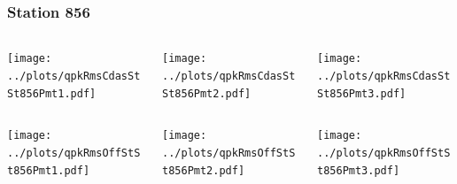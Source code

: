 \documentclass[aspectratio=169]{beamer}
\begin{document}
\begin{frame} 
  \frametitle{Station 856}
  \begin{center}
    \begin{columns}
      \begin{column}{0.33\textwidth}
        \texttt{[image: ../plots/qpkRmsCdasStSt856Pmt1.pdf]}
      \end{column}
      \begin{column}{0.33\textwidth}
        \texttt{[image: ../plots/qpkRmsCdasStSt856Pmt2.pdf]}
      \end{column}
      \begin{column}{0.33\textwidth}
        \texttt{[image: ../plots/qpkRmsCdasStSt856Pmt3.pdf]}
      \end{column}
    \end{columns}
  \end{center}

  \begin{center}
    \begin{columns}
      \begin{column}{0.33\textwidth}
        \texttt{[image: ../plots/qpkRmsOffStSt856Pmt1.pdf]}
      \end{column}
      \begin{column}{0.33\textwidth}
        \texttt{[image: ../plots/qpkRmsOffStSt856Pmt2.pdf]}
      \end{column}
      \begin{column}{0.33\textwidth}
        \texttt{[image: ../plots/qpkRmsOffStSt856Pmt3.pdf]}
      \end{column}
    \end{columns}
  \end{center}
\end{frame}
\end{document}
